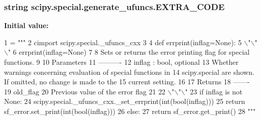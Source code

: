 \subsubsection[{E\+X\+T\+R\+A\+\_\+\+C\+O\+D\+E}]{\setlength{\rightskip}{0pt plus 5cm}string scipy.\+special.\+generate\+\_\+ufuncs.\+E\+X\+T\+R\+A\+\_\+\+C\+O\+D\+E}\label{namespacescipy_1_1special_1_1generate__ufuncs_a943ae4cdb059f402d7b0b0d64e0126b2}
{\bfseries Initial value\+:}
\begin{DoxyCode}
1 = \textcolor{stringliteral}{"""}
2 \textcolor{stringliteral}{cimport scipy.special.\_ufuncs\_cxx}
3 \textcolor{stringliteral}{}
4 \textcolor{stringliteral}{def errprint(inflag=None):}
5 \textcolor{stringliteral}{    \(\backslash\)"\(\backslash\)"\(\backslash\)"}
6 \textcolor{stringliteral}{    errprint(inflag=None)}
7 \textcolor{stringliteral}{}
8 \textcolor{stringliteral}{    Sets or returns the error printing flag for special functions.}
9 \textcolor{stringliteral}{}
10 \textcolor{stringliteral}{    Parameters}
11 \textcolor{stringliteral}{    ----------}
12 \textcolor{stringliteral}{    inflag : bool, optional}
13 \textcolor{stringliteral}{        Whether warnings concerning evaluation of special functions in}
14 \textcolor{stringliteral}{        scipy.special are shown. If omitted, no change is made to the}
15 \textcolor{stringliteral}{        current setting.}
16 \textcolor{stringliteral}{}
17 \textcolor{stringliteral}{    Returns}
18 \textcolor{stringliteral}{    -------}
19 \textcolor{stringliteral}{    old\_flag}
20 \textcolor{stringliteral}{        Previous value of the error flag}
21 \textcolor{stringliteral}{}
22 \textcolor{stringliteral}{    \(\backslash\)"\(\backslash\)"\(\backslash\)"}
23 \textcolor{stringliteral}{    if inflag is not None:}
24 \textcolor{stringliteral}{        scipy.special.\_ufuncs\_cxx.\_set\_errprint(int(bool(inflag)))}
25 \textcolor{stringliteral}{        return sf\_error.set\_print(int(bool(inflag)))}
26 \textcolor{stringliteral}{    else:}
27 \textcolor{stringliteral}{        return sf\_error.get\_print()}
28 \textcolor{stringliteral}{"""}
\end{DoxyCode}
\hypertarget{namespacescipy_1_1special_1_1generate__ufuncs_ae166fec34c660258ed3c76495a2637b7}{}
